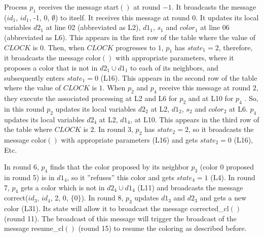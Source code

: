 \documentclass[11pt,english]{article}
\newcommand{\CLOCK}{\mathit{CLOCK}}
\begin{document}
Process $p_1$ receives the message {\sc start}$()$ at round $-1$. It
broadcasts the message \ccolor($id_1$, $id_1$, -1, 0, $\emptyset$) to
itself. It receives this message at round $0$.  It updates its local
variables $d2_1$ at line 02 (abbreviated as L2), $d1_1$, $s_1$ and
$color_1$ at line 06 (abbreviated as L6). This appears in the first
row of the table where the value of $\CLOCK$ is $0$. Then, when
$\CLOCK$ progresses to $1$, $p_1$ has $state_1=2$, therefore, it
broadcasts the message {\sc color}$()$ with appropriate parameters,
where it proposes a color that is not in $d2_1\cup d1_1$ to each of
its neighbors, and subsequently enters $state_1= 0$ (L16). This
appears in the second row of the table where the value of $\CLOCK$ is
$1$.  When $p_2$ and $p_4$ receive this message at round $2$, they
execute the associated processing at L2 and L6 for $p_2$ and at L10
for $p_4$ . So, in this round $p_2$ updates its local variables $d2_2$
at L2, $d1_2$, $s_2$ and $color_2$ at L6.  $p_4$ updates its local
variables $d2_4$ at L2, $d1_4$, at L10. This appears in the third row
of the table where $\CLOCK$ is $2$. In round 3, $p_2$ has $state_2=2$,
so it broadcasts the message {\sc color}$()$ with appropriate
parameters (L16) and gets $state_2= 0$ (L16), Etc.

In round 6, $p_4$ finds that the color proposed by its neighbor $p_3$
(color 0 proposed in round 5) is in $d1_4$, so it ''refuses'' this
color and gets $state_4= 1$ (L4).  In round 7, $p_4$ gets a color
which is not in $d2_4\cup d1_4$ (L11) and broadcasts the message
{\sc correct}($id_3$, $id_4$, 2, 0, $\lbrace 0\rbrace$). In round 8, $p_3$
updates $d1_3$ and $d2_3$ and gets a new color (L31). Its state will
allow it to broadcast the message {\sc corrected\_cl}$()$ (round 11). The
broadcast of this message will trigger the broadcast of the message
{\sc resume\_cl}$()$ (round 15) to resume the coloring as described before.
\end{document}

